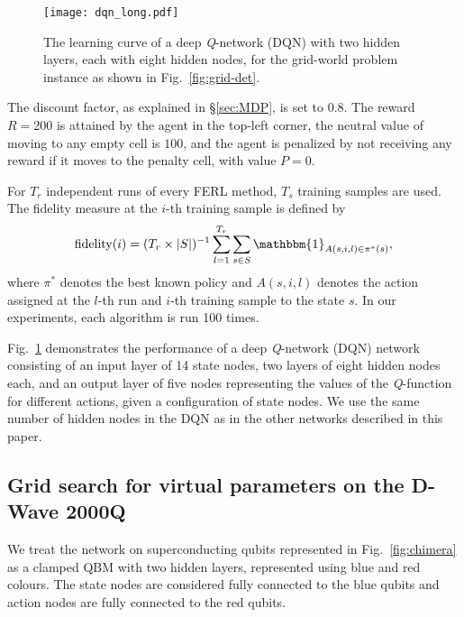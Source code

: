 \documentclass[pra,twocolumn,floatfix,superscriptaddress]{revtex4}
\begin{document}
\begin{figure}[b]
     \texttt{[image: dqn\_long.pdf]}
\caption{\footnotesize{The learning curve of a deep \emph{Q}-network (DQN) with two hidden layers, each with eight hidden nodes, for the grid-world problem instance as shown in Fig.~\ref{fig:grid-det}.}}
  \label{fig:dqn}
\end{figure}

The discount factor, as explained in \S\ref{sec:MDP}, is set to $0.8$. The reward $R= 200$ is attained by the agent in the top-left corner, the neutral value of moving to any empty cell is $100$, and the agent is penalized by not receiving any reward if it moves to the penalty cell, with value $P= 0$. 

For $T_r$ independent runs of every FERL method, $T_s$ training samples are used. The fidelity measure at the $i$-th training sample is defined by
\begin{equation}
\text{fidelity}(i) =(T_r \times |S|)^{-1} \sum_{l = 1}^{T_r} \sum_{s\in S} \mathbbm{1}_{A(s, i, l) \in \pi^*(s)},  
\label{similaritymeasure}
\end{equation}
where $\pi^*$ denotes the best known policy and $A(s, i, l)$ denotes the action assigned at the $l$-th run and $i$-th training sample to the state $s$. In our experiments, each algorithm is run 100 times. 

Fig.~\ref{fig:dqn} demonstrates the performance of a deep \emph{Q}-network (DQN) network \cite{DQN} consisting of an input layer of 14 state nodes, two layers of eight hidden nodes each, and an output layer of five nodes representing the values of the \emph{Q}-function for different actions, given a configuration of state nodes. We use the same number of hidden nodes in the DQN as in the other networks described in this paper.





\subsection{Grid search for virtual parameters on the D-Wave 2000Q} \label{sec:gridsearch}

We treat the network on superconducting qubits represented in Fig.~\ref{fig:chimera} as a clamped QBM with two hidden layers, represented using blue and red colours. The state nodes are considered fully connected to the blue qubits and action nodes are fully connected to the red qubits. 
\end{document}
